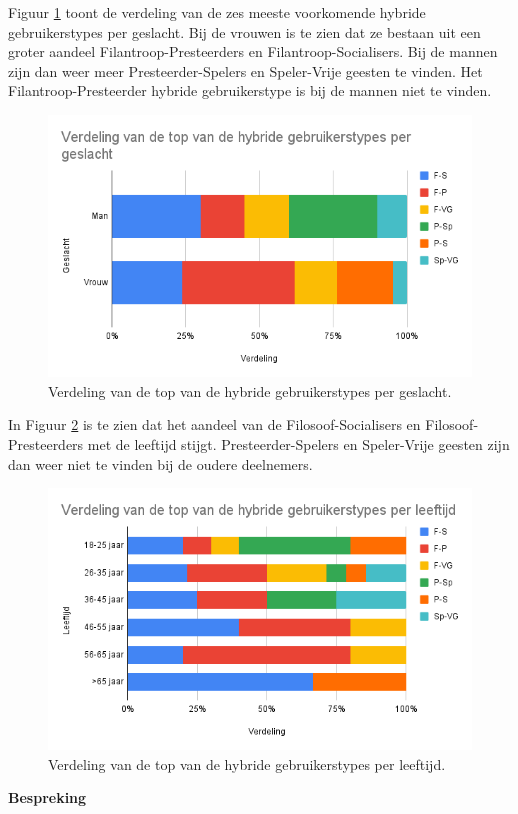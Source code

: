 Figuur \ref{fig:hybridegeslacht} toont de verdeling van de zes meeste voorkomende hybride gebruikerstypes per geslacht. Bij de vrouwen is te zien dat ze bestaan uit een groter aandeel Filantroop-Presteerders en Filantroop-Socialisers. Bij de mannen zijn dan weer meer Presteerder-Spelers en Speler-Vrije geesten te vinden. Het Filantroop-Presteerder hybride gebruikerstype is bij de mannen niet te vinden.

\begin{figure}
    \includegraphics[width=\linewidth]{HybrideGeslacht.png}
    \caption{Verdeling van de top van de hybride gebruikerstypes per geslacht.}
    \label{fig:hybridegeslacht}
\end{figure}

In Figuur \ref{fig:hybrideleeftijd} is te zien dat het aandeel van de Filosoof-Socialisers en Filosoof-Presteerders met de leeftijd stijgt. Presteerder-Spelers en Speler-Vrije geesten zijn dan weer niet te vinden bij de oudere deelnemers.

\begin{figure}
    \includegraphics[width=\linewidth]{HybrideLeeftijd.png}
    \caption{Verdeling van de top van de hybride gebruikerstypes per leeftijd.}
    \label{fig:hybrideleeftijd}
\end{figure}

\textbf{Bespreking}



